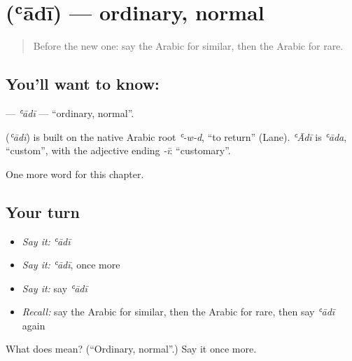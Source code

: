 \section[\texorpdfstring{\ar{عادي} (ʿādī)}{عادي (ʿādī)}]{ (ʿādī) — ordinary, normal}

\label{lesson:AR-C211-adi}



\begin{quote}
Before the new one: say the Arabic for similar, then the Arabic for rare.
\end{quote}

\subsection*{You'll want to know: }
\textbf{} — \emph{ʿādī} — \textquotedblleft{}ordinary, normal\textquotedblright{}.

\begin{cousinweb}
\textbf{} (\emph{ʿādī}) is built on the native Arabic root \emph{ʿ-w-d}, \textquotedblleft{}to return\textquotedblright{} (Lane). \emph{ʿĀdī} is \emph{ʿāda}, \textquotedblleft{}custom\textquotedblright{}, with the adjective ending \emph{-ī}: \textquotedblleft{}customary\textquotedblright{}.
\end{cousinweb}

\begin{grammarlens}[title={What you've built}]
One more word for this chapter.
\end{grammarlens}

\subsection*{Your turn}
\begin{itemize}
\raggedright
  \item \emph{Say it:} \emph{ʿādī}
  \item \emph{Say it:} \emph{ʿādī}, once more
  \item \emph{Say it:} say \emph{ʿādī}
  \item \emph{Recall:} say the Arabic for similar, then the Arabic for rare, then say \emph{ʿādī} again
\end{itemize}

\begin{tcolorbox}[breakable,colback=teal!4,colframe=teal!35!black,title={Before you move on}]
What does  mean? (\textquotedblleft{}Ordinary, normal\textquotedblright{}.) Say it once more.
\end{tcolorbox}
